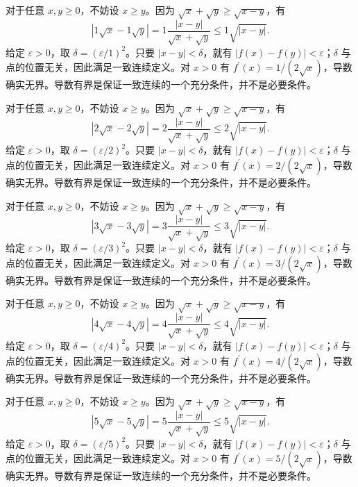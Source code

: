 \documentclass[UTF8,12pt,a4paper,fontset=fandol]{ctexart}
\begin{document}
\begin{solve}\label{ans:c6q13}
对于任意 $x,y\ge0$，不妨设 $x\ge y$。因为 $\sqrt x+\sqrt y\ge\sqrt{x-y}$，有
\[
|1\sqrt x-1\sqrt y|=1\frac{|x-y|}{\sqrt x+\sqrt y}\le 1\sqrt{|x-y|}.
\]
给定 $\varepsilon>0$，取 $\delta=(\varepsilon/1)^2$。只要 $|x-y|<\delta$，就有 $|f(x)-f(y)|<\varepsilon$；$\delta$ 与点的位置无关，因此满足一致连续定义。对 $x>0$ 有 $f^{\prime}(x)=1/(2\sqrt x)$，导数确实无界。导数有界是保证一致连续的一个充分条件，并不是必要条件。
\end{solve}

\begin{solve}\label{ans:c6q14}
对于任意 $x,y\ge0$，不妨设 $x\ge y$。因为 $\sqrt x+\sqrt y\ge\sqrt{x-y}$，有
\[
|2\sqrt x-2\sqrt y|=2\frac{|x-y|}{\sqrt x+\sqrt y}\le 2\sqrt{|x-y|}.
\]
给定 $\varepsilon>0$，取 $\delta=(\varepsilon/2)^2$。只要 $|x-y|<\delta$，就有 $|f(x)-f(y)|<\varepsilon$；$\delta$ 与点的位置无关，因此满足一致连续定义。对 $x>0$ 有 $f^{\prime}(x)=2/(2\sqrt x)$，导数确实无界。导数有界是保证一致连续的一个充分条件，并不是必要条件。
\end{solve}

\begin{solve}\label{ans:c6q15}
对于任意 $x,y\ge0$，不妨设 $x\ge y$。因为 $\sqrt x+\sqrt y\ge\sqrt{x-y}$，有
\[
|3\sqrt x-3\sqrt y|=3\frac{|x-y|}{\sqrt x+\sqrt y}\le 3\sqrt{|x-y|}.
\]
给定 $\varepsilon>0$，取 $\delta=(\varepsilon/3)^2$。只要 $|x-y|<\delta$，就有 $|f(x)-f(y)|<\varepsilon$；$\delta$ 与点的位置无关，因此满足一致连续定义。对 $x>0$ 有 $f^{\prime}(x)=3/(2\sqrt x)$，导数确实无界。导数有界是保证一致连续的一个充分条件，并不是必要条件。
\end{solve}

\begin{solve}\label{ans:c6q16}
对于任意 $x,y\ge0$，不妨设 $x\ge y$。因为 $\sqrt x+\sqrt y\ge\sqrt{x-y}$，有
\[
|4\sqrt x-4\sqrt y|=4\frac{|x-y|}{\sqrt x+\sqrt y}\le 4\sqrt{|x-y|}.
\]
给定 $\varepsilon>0$，取 $\delta=(\varepsilon/4)^2$。只要 $|x-y|<\delta$，就有 $|f(x)-f(y)|<\varepsilon$；$\delta$ 与点的位置无关，因此满足一致连续定义。对 $x>0$ 有 $f^{\prime}(x)=4/(2\sqrt x)$，导数确实无界。导数有界是保证一致连续的一个充分条件，并不是必要条件。
\end{solve}

\begin{solve}\label{ans:c6q17}
对于任意 $x,y\ge0$，不妨设 $x\ge y$。因为 $\sqrt x+\sqrt y\ge\sqrt{x-y}$，有
\[
|5\sqrt x-5\sqrt y|=5\frac{|x-y|}{\sqrt x+\sqrt y}\le 5\sqrt{|x-y|}.
\]
给定 $\varepsilon>0$，取 $\delta=(\varepsilon/5)^2$。只要 $|x-y|<\delta$，就有 $|f(x)-f(y)|<\varepsilon$；$\delta$ 与点的位置无关，因此满足一致连续定义。对 $x>0$ 有 $f^{\prime}(x)=5/(2\sqrt x)$，导数确实无界。导数有界是保证一致连续的一个充分条件，并不是必要条件。
\end{solve}
\end{document}
